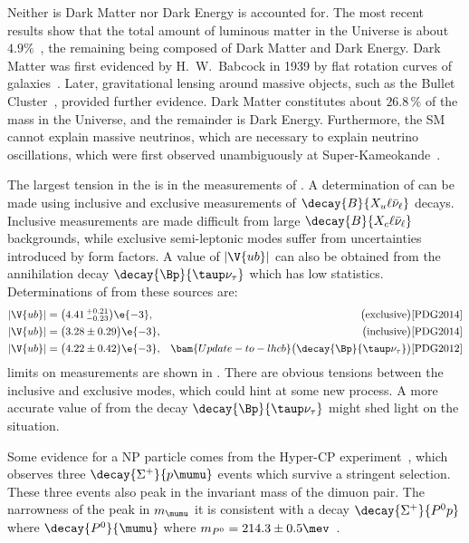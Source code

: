 Neither is Dark Matter nor Dark Energy is accounted for.
The most recent results show that the total amount of luminous matter in the Universe is about
$4.9\%$~\cite{Ade:2015srua,PDG2014}, the remaining being composed of Dark Matter and Dark Energy.
Dark Matter was first evidenced by H.~W.~Babcock in 1939 by flat rotation curves of
galaxies~\cite{1970ApJ...159..379R,1980ApJ...238..471R}.
Later, gravitational lensing around massive objects, such as the Bullet
Cluster~\cite{Markevitch:2003at}, provided further evidence.
Dark Matter constitutes about $26.8\,\%$ of the mass in the Universe, and the remainder is Dark
Energy.
Furthermore, the SM cannot explain massive neutrinos, which are necessary to explain neutrino
oscillations, which were first observed unambiguously at
Super-Kameokande~\cite{PhysRevLett.81.1562}.



The largest tension in the \ut is in  the measurements of .
A determination of  can be made using inclusive and exclusive measurements of
$\decay{B}{X_u\ell\bar\nu_\ell}$ decays.
Inclusive measurements are made difficult from large
$\decay{B}{X_c\ell\bar\nu_\ell}$ backgrounds, while exclusive semi-leptonic modes suffer from
uncertainties introduced by form factors.
A value of $\left|\V{ub}\right|$ can also be obtained from the annihilation decay
$\decay{\Bp}{\taup\nu_\tau}$ which has low statistics.
Determinations of  from these sources are:
\begin{align}
  |\V{ub}| &= \big(4.41\,^{+0.21}_{-0.23}\big)\e{-3}, & \quad\big(\mathrm{exclusive}\big)\text{\cite{PDG2014}}& \nonumber\\
  |\V{ub}| &= \big(3.28\pm{0.29}\big)\e{-3},  & \big(\mathrm{inclusive}\big)\text{\cite{PDG2014}}&\nonumber\\
  |\V{ub}| &= \big(4.22\pm{0.42}\big)\e{-3},  &
  \bam{Update-to-lhcb} \big(\decay{\Bp}{\taup\nu_\tau}\big)\text{\cite{PDG2012}}&\nonumber\\
  \label{eq:th:vub}
\end{align}
limits on \ut measurements are shown in .
There are obvious tensions between the inclusive and exclusive modes, which could hint at some new
process.
A more accurate value of  from the decay $\decay{\Bp}{\taup\nu_\tau}$ might shed light on the
situation.

Some evidence for a NP particle comes from the Hyper-CP experiment~\cite{Burnstein:2004uk}, which
observes three $\decay{\Sigma^+}{p\mumu}$ events which survive a stringent selection.
These three events also peak in the invariant mass of the dimuon pair.
The narrowness of the peak in $m_{\mumu}$ it is consistent with a decay $\decay{\Sigma^+}{P^0p}$
where $\decay{P^0}{\mumu}$ where $m_{P^0}=214.3\pm0.5\mev$~\cite{Park:2005eka}.

